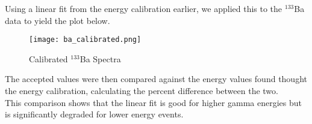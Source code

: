 
Using a linear fit from the energy calibration earlier, we applied this to the $^{133}$Ba data to yield the
plot below.

\begin{figure}[H]
  \begin{center}
    \texttt{[image: ba\_calibrated.png]}
    \caption{\label{fig:ba133}Calibrated $^{133}$Ba Spectra}
  \end{center}
\end{figure}

The accepted values were then compared against the energy values found thought the energy calibration, calculating the
percent difference between the two.
\\




This comparison shows that the linear fit is good for higher gamma energies but is significantly
degraded for lower energy events.
